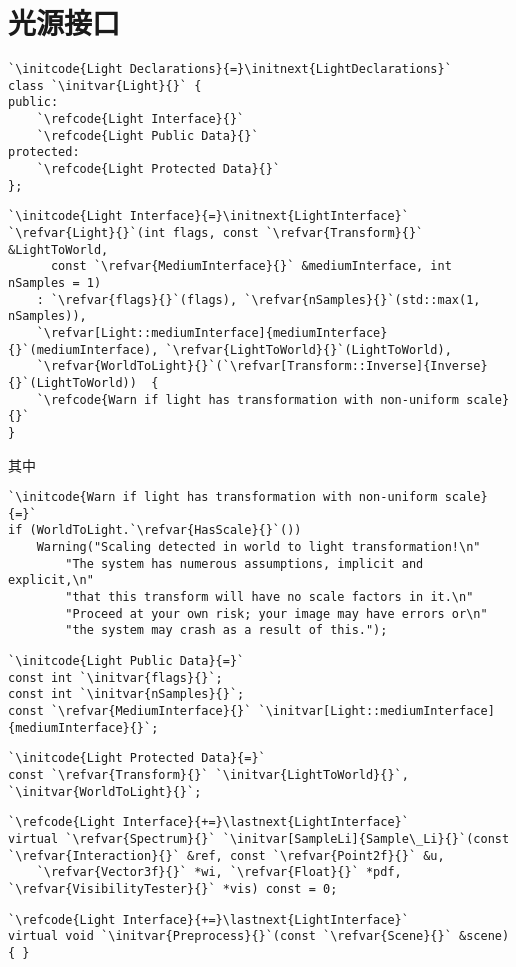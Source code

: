 \section{光源接口}\label{sec:光源接口}

\begin{lstlisting}
`\initcode{Light Declarations}{=}\initnext{LightDeclarations}`
class `\initvar{Light}{}` {
public:
    `\refcode{Light Interface}{}`
    `\refcode{Light Public Data}{}`
protected:
    `\refcode{Light Protected Data}{}`
};
\end{lstlisting}

\begin{lstlisting}
`\initcode{Light Interface}{=}\initnext{LightInterface}`
`\refvar{Light}{}`(int flags, const `\refvar{Transform}{}` &LightToWorld,
      const `\refvar{MediumInterface}{}` &mediumInterface, int nSamples = 1)
    : `\refvar{flags}{}`(flags), `\refvar{nSamples}{}`(std::max(1, nSamples)),
    `\refvar[Light::mediumInterface]{mediumInterface}{}`(mediumInterface), `\refvar{LightToWorld}{}`(LightToWorld),
    `\refvar{WorldToLight}{}`(`\refvar[Transform::Inverse]{Inverse}{}`(LightToWorld))  { 
    `\refcode{Warn if light has transformation with non-uniform scale}{}`
}
\end{lstlisting}
其中
\begin{lstlisting}
`\initcode{Warn if light has transformation with non-uniform scale}{=}`
if (WorldToLight.`\refvar{HasScale}{}`())
    Warning("Scaling detected in world to light transformation!\n"
        "The system has numerous assumptions, implicit and explicit,\n"
        "that this transform will have no scale factors in it.\n"
        "Proceed at your own risk; your image may have errors or\n"
        "the system may crash as a result of this.");
\end{lstlisting}
\begin{lstlisting}
`\initcode{Light Public Data}{=}`
const int `\initvar{flags}{}`;
const int `\initvar{nSamples}{}`;
const `\refvar{MediumInterface}{}` `\initvar[Light::mediumInterface]{mediumInterface}{}`;
\end{lstlisting}

\begin{lstlisting}
`\initcode{Light Protected Data}{=}`
const `\refvar{Transform}{}` `\initvar{LightToWorld}{}`, `\initvar{WorldToLight}{}`;
\end{lstlisting}
\begin{lstlisting}
`\refcode{Light Interface}{+=}\lastnext{LightInterface}`
virtual `\refvar{Spectrum}{}` `\initvar[SampleLi]{Sample\_Li}{}`(const `\refvar{Interaction}{}` &ref, const `\refvar{Point2f}{}` &u,
    `\refvar{Vector3f}{}` *wi, `\refvar{Float}{}` *pdf, `\refvar{VisibilityTester}{}` *vis) const = 0;
\end{lstlisting}
\begin{lstlisting}
`\refcode{Light Interface}{+=}\lastnext{LightInterface}`
virtual void `\initvar{Preprocess}{}`(const `\refvar{Scene}{}` &scene) { }
\end{lstlisting}

